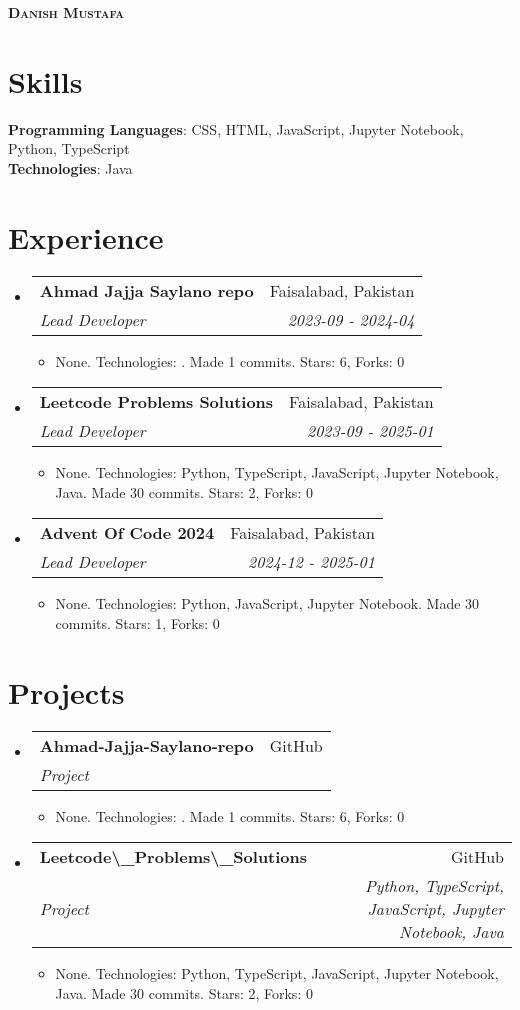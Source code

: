 \documentclass[letterpaper,11pt]{article}
\makeatletter
\newcommand{\resumeItem}[1]{
  \item\small{
    {#1 \vspace{-2pt}}
  }
}
\newcommand{\resumeSubheading}[4]{
  \vspace{-2pt}\item
    \begin{tabular*}{0.97\textwidth}[t]{l@{\extracolsep{\fill}}r}
      \textbf{#1} & #2 \\
      \textit{\small#3} & \textit{\small #4} \\
    \end{tabular*}\vspace{-7pt}
}
\newcommand{\resumeSubHeadingListStart}{\begin{itemize}[leftmargin=0.15in, label={}]}
\newcommand{\resumeSubHeadingListEnd}{\end{itemize}}
\newcommand{\resumeItemListStart}{\begin{itemize}}
\newcommand{\resumeItemListEnd}{\end{itemize}\vspace{-5pt}}
\makeatother
\begin{document}
\begin{center}
    \textbf{\Huge \scshape Danish Mustafa}
\end{center}

\section{Skills}
\begin{itemize}[leftmargin=0.15in, label={}]
    \small{\item{
    \textbf{Programming Languages}: CSS, HTML, JavaScript, Jupyter Notebook, Python, TypeScript \\
    \textbf{Technologies}: Java \\
    }}
\end{itemize}

\section{Experience}
\resumeSubHeadingListStart
\resumeSubheading
            {Ahmad Jajja Saylano repo}{Faisalabad, Pakistan}
            {Lead Developer}{2023-09 - 2024-04}
            \resumeItemListStart
            \resumeItem{None. Technologies: . Made 1 commits. Stars: 6, Forks: 0}
            \resumeItemListEnd
\resumeSubheading
            {Leetcode Problems Solutions}{Faisalabad, Pakistan}
            {Lead Developer}{2023-09 - 2025-01}
            \resumeItemListStart
            \resumeItem{None. Technologies: Python, TypeScript, JavaScript, Jupyter Notebook, Java. Made 30 commits. Stars: 2, Forks: 0}
            \resumeItemListEnd
\resumeSubheading
            {Advent Of Code 2024}{Faisalabad, Pakistan}
            {Lead Developer}{2024-12 - 2025-01}
            \resumeItemListStart
            \resumeItem{None. Technologies: Python, JavaScript, Jupyter Notebook. Made 30 commits. Stars: 1, Forks: 0}
            \resumeItemListEnd
\resumeSubHeadingListEnd

\section{Projects}
\resumeSubHeadingListStart
\resumeSubheading
                {Ahmad-Jajja-Saylano-repo}{GitHub}
                {Project}{}
                \resumeItemListStart
                \resumeItem{None. Technologies: . Made 1 commits. Stars: 6, Forks: 0}
                \resumeItemListEnd
\resumeSubheading
                {Leetcode\textbackslash{}_Problems\textbackslash{}_Solutions}{GitHub}
                {Project}{Python, TypeScript, JavaScript, Jupyter Notebook, Java}
                \resumeItemListStart
                \resumeItem{None. Technologies: Python, TypeScript, JavaScript, Jupyter Notebook, Java. Made 30 commits. Stars: 2, Forks: 0}
                \resumeItemListEnd
\resumeSubHeadingListEnd
\end{document}
